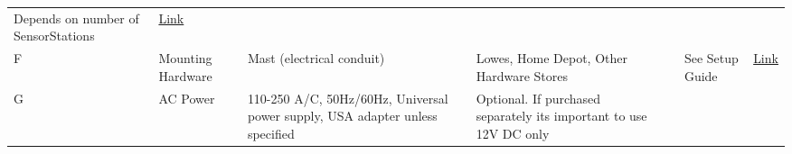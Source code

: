 \documentclass[
]{article}
\begin{document}
\begin{longtable}[]{@{}lllllll@{}}
\begin{minipage}[t]{0.12\columnwidth}
Depends on number of SensorStations\strut
\end{minipage} & \begin{minipage}[t]{0.12\columnwidth}\raggedright
\href{https://www.amazon.com/feet-Satellite-Tripod-Mount-2-Inch/dp/B0043OAI9M/ref=sr_1_3?keywords=antenna+tripod\&qid=1555017820\&s=electronics\&sr=1-3}{Link}\strut
\end{minipage}\tabularnewline
\begin{minipage}[t]{0.12\columnwidth}\raggedright
F\strut
\end{minipage} & \begin{minipage}[t]{0.12\columnwidth}\raggedright
Mounting Hardware\strut
\end{minipage} & \begin{minipage}[t]{0.12\columnwidth}\raggedright
Mast (electrical conduit)\strut
\end{minipage} & \begin{minipage}[t]{0.12\columnwidth}\raggedright
Lowes, Home Depot, Other Hardware Stores\strut
\end{minipage} & \begin{minipage}[t]{0.12\columnwidth}\raggedright
\strut
\end{minipage} & \begin{minipage}[t]{0.12\columnwidth}\raggedright
See Setup Guide\strut
\end{minipage} & \begin{minipage}[t]{0.12\columnwidth}\raggedright
\href{https://www.lowes.com/search?searchTerm=emt+conduit}{Link}\strut
\end{minipage}\tabularnewline
\begin{minipage}[t]{0.12\columnwidth}\raggedright
G\strut
\end{minipage} & \begin{minipage}[t]{0.12\columnwidth}\raggedright
AC Power\strut
\end{minipage} & \begin{minipage}[t]{0.12\columnwidth}\raggedright
110-250 A/C, 50Hz/60Hz, Universal power supply, USA adapter unless
specified\strut
\end{minipage} & \begin{minipage}[t]{0.12\columnwidth}\raggedright
Optional. If purchased separately its important to use 12V DC only\strut
\end{minipage} & \begin{minipage}[t]{0.12\columnwidth}\raggedright
\strut
\end{minipage} & \begin{minipage}[t]{0.12\columnwidth}\raggedright

\end{minipage}
\end{longtable}
\end{document}
